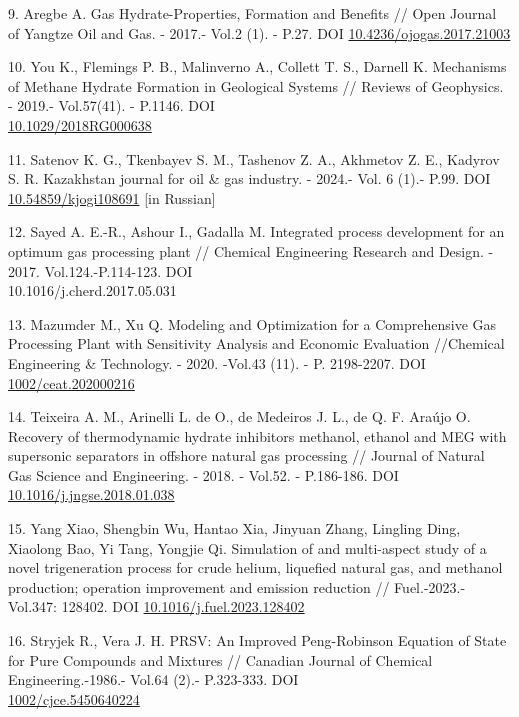 \begin{refs}
9. Aregbe A. Gas Hydrate-Properties, Formation and Benefits // Open
Journal of Yangtze Oil and Gas. - 2017.- Vol.2 (1). - P.27. DOI
\href{https://doi.org/10.4236/ojogas.2017.21003}{10.4236/ojogas.2017.21003}

10. You K., Flemings P. B., Malinverno A., Collett T. S., Darnell K.
Mechanisms of Methane Hydrate Formation in Geological Systems // Reviews
of Geophysics. - 2019.- Vol.57(41). - P.1146. DOI\\
\href{https://doi.org/10.1029/2018RG000638}{10.1029/2018RG000638}

11. Satenov K. G., Tkenbayev S. M., Tashenov Z. A., Akhmetov Z. E.,
Kadyrov S. R. Kazakhstan journal for oil \& gas industry. - 2024.- Vol.
6 (1).- P.99. DOI
\href{https://doi.org/10.54859/kjogi108691}{10.54859/kjogi108691} {[}in
Russian{]}

12. Sayed A. E.-R., Ashour I., Gadalla M. Integrated process development
for an optimum gas processing plant // Chemical Engineering Research and
Design. - 2017. Vol.124.-P.114-123. DOI \\10.1016/j.cherd.2017.05.031

13. Mazumder M., Xu Q. Modeling and Optimization for a Comprehensive Gas
Processing Plant with Sensitivity Analysis and Economic Evaluation
//Chemical Engineering \& Technology. - 2020. -Vol.43 (11). - P.
2198-2207. DOI
\href{https://doi.org/1002/ceat.202000216}{1002/ceat.202000216}

14. Teixeira A. M., Arinelli L. de O., de Medeiros J. L., de Q. F.
Araújo O. Recovery of thermodynamic hydrate inhibitors methanol, ethanol
and MEG with supersonic separators in offshore natural gas processing //
Journal of Natural Gas Science and Engineering. - 2018. - Vol.52. -
P.186-186. DOI\\
\href{https://doi:10.1016/j.jngse.2018.01.038}{10.1016/j.jngse.2018.01.038}

15. Yang Xiao, Shengbin Wu, Hantao Xia, Jinyuan Zhang, Lingling Ding,
Xiaolong Bao, Yi Tang, Yongjie Qi. Simulation of and multi-aspect study
of a novel trigeneration process for crude helium, liquefied natural
gas, and methanol production; operation improvement and emission
reduction // Fuel.-2023.-Vol.347: 128402. DOI
\href{https://doi.org/10.1016/j.fuel.2023.128402}{10.1016/j.fuel.2023.128402}

16. Stryjek R., Vera J. H. PRSV: An Improved Peng-Robinson Equation of
State for Pure Compounds and Mixtures // Canadian Journal of Chemical
Engineering.-1986.- Vol.64 (2).- P.323-333. DOI\\
\href{https://doi:1002/cjce.5450640224}{1002/cjce.5450640224}


\end{refs}
